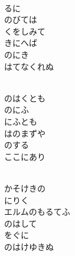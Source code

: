 \documentclass[10pt,b5j]{tarticle} %
\begin{document}
\begin{enumerate}
\begin{minipage}[c]{\blocksize}
    \end{minipage}
    \begin{minipage}[c]{\blocksize}
        
        \vspace{\linespace}
        \item~\\
        るに\\
        のびては\\
        くをしみて\\
        きにへば\\
        のにき\\
        はてなくれぬ
        
    \end{minipage}
    \begin{minipage}[c]{\blocksize}
        
        \vspace{\linespace}
        \item~\\
        のはくとも\\
        のにふ\\
        にふとも\\
        はのまずや\\
        のする\\
        ここにあり
        
    \end{minipage}
    \begin{minipage}[c]{\blocksize}
        
        \vspace{\linespace}
        \item~\\
        かそけきの\\
        にりく\\
        エルムのもるてふ\\
        のはして\\
        をぐに\\
        のはけゆきぬ
        

\end{minipage}
\end{enumerate}
\end{document}
